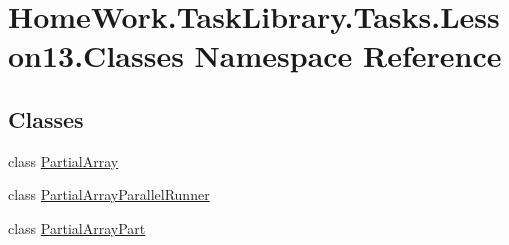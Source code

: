 \hypertarget{namespace_home_work_1_1_task_library_1_1_tasks_1_1_lesson13_1_1_classes}{}\section{Home\+Work.\+Task\+Library.\+Tasks.\+Lesson13.\+Classes Namespace Reference}
\label{namespace_home_work_1_1_task_library_1_1_tasks_1_1_lesson13_1_1_classes}
\subsection*{Classes}
\begin{DoxyCompactItemize}
\item 
class \mbox{\hyperlink{class_home_work_1_1_task_library_1_1_tasks_1_1_lesson13_1_1_classes_1_1_partial_array}{Partial\+Array}}
\item 
class \mbox{\hyperlink{class_home_work_1_1_task_library_1_1_tasks_1_1_lesson13_1_1_classes_1_1_partial_array_parallel_runner}{Partial\+Array\+Parallel\+Runner}}
\item 
class \mbox{\hyperlink{class_home_work_1_1_task_library_1_1_tasks_1_1_lesson13_1_1_classes_1_1_partial_array_part}{Partial\+Array\+Part}}
\end{DoxyCompactItemize}
